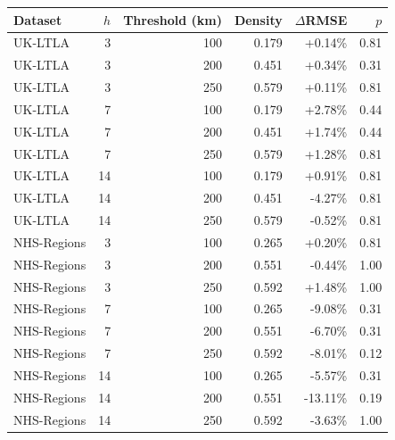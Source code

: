 \begin{tabular}{lrrrrr}
\hline
Dataset & $h$ & Threshold (km) & Density & $\Delta$RMSE & $p$ \\
\hline
UK-LTLA & 3 & 100 & 0.179 & +0.14\% & 0.81 \\
UK-LTLA & 3 & 200 & 0.451 & +0.34\% & 0.31 \\
UK-LTLA & 3 & 250 & 0.579 & +0.11\% & 0.81 \\
UK-LTLA & 7 & 100 & 0.179 & +2.78\% & 0.44 \\
UK-LTLA & 7 & 200 & 0.451 & +1.74\% & 0.44 \\
UK-LTLA & 7 & 250 & 0.579 & +1.28\% & 0.81 \\
UK-LTLA & 14 & 100 & 0.179 & +0.91\% & 0.81 \\
UK-LTLA & 14 & 200 & 0.451 & -4.27\% & 0.81 \\
UK-LTLA & 14 & 250 & 0.579 & -0.52\% & 0.81 \\
NHS-Regions & 3 & 100 & 0.265 & +0.20\% & 0.81 \\
NHS-Regions & 3 & 200 & 0.551 & -0.44\% & 1.00 \\
NHS-Regions & 3 & 250 & 0.592 & +1.48\% & 1.00 \\
NHS-Regions & 7 & 100 & 0.265 & -9.08\% & 0.31 \\
NHS-Regions & 7 & 200 & 0.551 & -6.70\% & 0.31 \\
NHS-Regions & 7 & 250 & 0.592 & -8.01\% & 0.12 \\
NHS-Regions & 14 & 100 & 0.265 & -5.57\% & 0.31 \\
NHS-Regions & 14 & 200 & 0.551 & -13.11\% & 0.19 \\
NHS-Regions & 14 & 250 & 0.592 & -3.63\% & 1.00 \\
\hline
\end{tabular}
